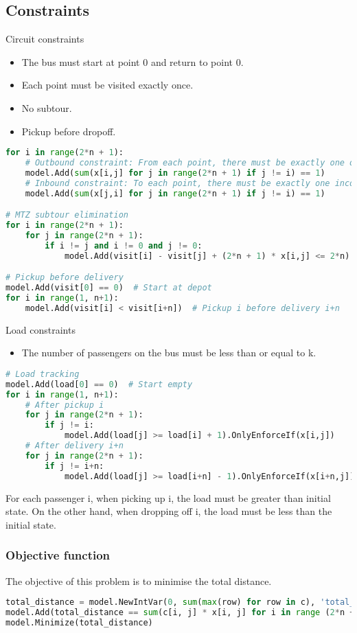 \documentclass{article}
\begin{document}
\subsection{Constraints}
Circuit constraints
\begin{itemize}
    \item The bus must start at point 0 and return to point 0.
    \item Each point must be visited exactly once.
    \item No subtour.
    \item Pickup before dropoff.
\end{itemize}
\begin{lstlisting}[language=Python]
for i in range(2*n + 1):
    # Outbound constraint: From each point, there must be exactly one outgoing edge.
    model.Add(sum(x[i,j] for j in range(2*n + 1) if j != i) == 1)
    # Inbound constraint: To each point, there must be exactly one incoming edge.
    model.Add(sum(x[j,i] for j in range(2*n + 1) if j != i) == 1)

# MTZ subtour elimination
for i in range(2*n + 1):
    for j in range(2*n + 1):
        if i != j and i != 0 and j != 0:
            model.Add(visit[i] - visit[j] + (2*n + 1) * x[i,j] <= 2*n)

# Pickup before delivery
model.Add(visit[0] == 0)  # Start at depot
for i in range(1, n+1):
    model.Add(visit[i] < visit[i+n])  # Pickup i before delivery i+n
\end{lstlisting}

Load constraints
\begin{itemize}
    \item The number of passengers on the bus must be less than or equal to k.
\end{itemize}
\begin{lstlisting}[language=Python]
# Load tracking
model.Add(load[0] == 0)  # Start empty
for i in range(1, n+1):
    # After pickup i
    for j in range(2*n + 1):
        if j != i:
            model.Add(load[j] >= load[i] + 1).OnlyEnforceIf(x[i,j])
    # After delivery i+n
    for j in range(2*n + 1):
        if j != i+n:
            model.Add(load[j] >= load[i+n] - 1).OnlyEnforceIf(x[i+n,j])
\end{lstlisting}

For each passenger i, when picking up i, the load must be greater than initial state.
On the other hand, when dropping off i, the load must be less than the initial state.

\subsubsection{Objective function}
The objective of this problem is to minimise the total distance.
\begin{lstlisting}[language=Python]
total_distance = model.NewIntVar(0, sum(max(row) for row in c), 'total_distance')
model.Add(total_distance == sum(c[i, j] * x[i, j] for i in range (2*n + 1) for j in range(2*n + 1) if i != j))
model.Minimize(total_distance)
\end{lstlisting}
\end{document}
